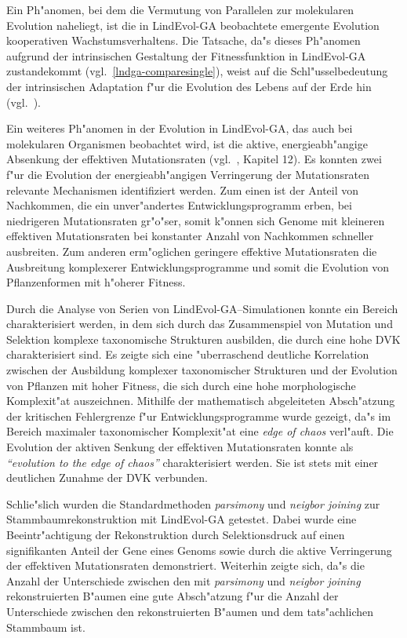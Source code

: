 Ein Ph"anomen, bei dem die Vermutung von Parallelen zur molekularen Evolution naheliegt, ist die in LindEvol-GA beobachtete
emergente Evolution kooperativen Wachstumsverhaltens. Die Tatsache, da"s dieses Ph"anomen aufgrund der
intrinsischen Gestaltung der Fitnessfunktion in LindEvol-GA zustandekommt (vgl.\ \ref{lndga-comparesingle}), weist
auf die Schl"usselbedeutung der intrinsischen Adaptation f"ur die Evolution des Lebens auf der Erde hin (vgl.\ \cite{Packard89}).

Ein weiteres Ph"anomen in der Evolution in LindEvol-GA, das auch bei molekularen Organismen beobachtet wird, ist die
aktive, energieabh"angige Absenkung der effektiven Mutationsraten (vgl.\ \cite{Watson}, Kapitel 12). Es konnten zwei
f"ur die Evolution der energieabh"angigen Verringerung der Mutationsraten relevante Mechanismen identifiziert werden.
Zum einen ist der Anteil von Nachkommen, die ein unver"andertes Entwicklungsprogramm erben, bei niedrigeren Mutationsraten
gr"o"ser, somit k"onnen sich Genome mit kleineren effektiven Mutationsraten bei konstanter Anzahl von Nachkommen schneller
ausbreiten. Zum anderen erm"oglichen geringere effektive Mutationsraten die Ausbreitung komplexerer Entwicklungsprogramme
und somit die Evolution von Pflanzenformen mit h"oherer Fitness.

Durch die Analyse von Serien von LindEvol-GA--Simulationen konnte ein Bereich charakterisiert werden, in dem sich durch
das Zusammenspiel von Mutation und Selektion komplexe taxonomische Strukturen ausbilden, die durch eine hohe DVK charakterisiert
sind. Es zeigte sich eine "uberraschend deutliche Korrelation zwischen der Ausbildung komplexer taxonomischer Strukturen und
der Evolution von Pflanzen mit hoher Fitness, die sich durch eine hohe morphologische Komplexit"at auszeichnen.
Mithilfe der mathematisch abgeleiteten Absch"atzung der kritischen Fehlergrenze f"ur Entwicklungsprogramme wurde
gezeigt, da"s im Bereich maximaler taxonomischer Komplexit"at eine \textsl{edge of chaos} verl"auft. Die Evolution
der aktiven Senkung der effektiven Mutationsraten konnte als \textsl{"`evolution to the edge of chaos"'} charakterisiert
werden. Sie ist stets mit einer deutlichen Zunahme der DVK verbunden.

Schlie"slich wurden die Standardmethoden \textsl{parsimony} und \textsl{neigbor joining} zur Stammbaumrekonstruktion mit
LindEvol-GA getestet. Dabei wurde eine Beeintr"achtigung der Rekonstruktion durch Selektionsdruck auf einen signifikanten
Anteil der Gene eines Genoms sowie durch die aktive Verringerung der effektiven Mutationsraten demonstriert. Weiterhin
zeigte sich, da"s die Anzahl der Unterschiede zwischen den mit \textsl{parsimony} und \textsl{neigbor joining} rekonstruierten
B"aumen eine gute Absch"atzung f"ur die Anzahl der Unterschiede zwischen den rekonstruierten B"aumen und dem tats"achlichen
Stammbaum ist.

